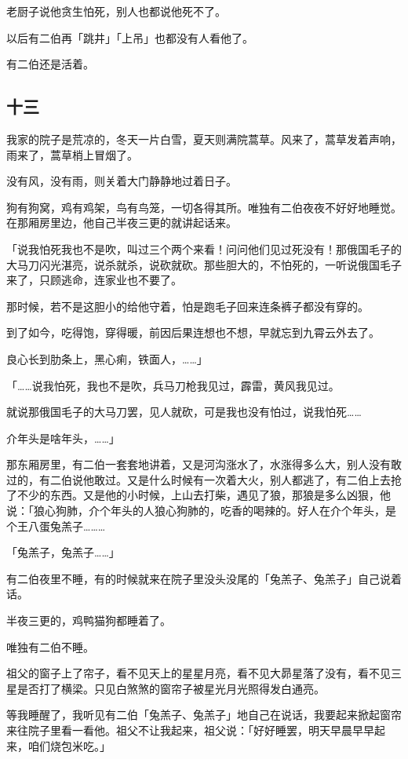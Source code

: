 \documentclass[UTF8]{ctexart}
\begin{document}
老厨子说他贪生怕死，别人也都说他死不了。

以后有二伯再「跳井」「上吊」也都没有人看他了。

{有二伯还是活着。}

\subsection{十三}

我家的院子是荒凉的，冬天一片白雪，夏天则满院蒿草。风来了，蒿草发着声响，雨来了，蒿草梢上冒烟了。

没有风，没有雨，则关着大门静静地过着日子。

狗有狗窝，鸡有鸡架，鸟有鸟笼，一切各得其所。唯独有二伯夜夜不好好地睡觉。在那厢房里边，他自己半夜三更的就讲起话来。

「说我怕死我也不是吹，叫过三个两个来看！问问他们见过死没有！那俄国毛子的大马刀闪光湛亮，说杀就杀，说砍就砍。那些胆大的，不怕死的，一听说俄国毛子来了，只顾逃命，连家业也不要了。

那时候，若不是这胆小的给他守着，怕是跑毛子回来连条裤子都没有穿的。

到了如今，吃得饱，穿得暖，前因后果连想也不想，早就忘到九霄云外去了。

良心长到肋条上，黑心痢，铁面人，……」

「……说我怕死，我也不是吹，兵马刀枪我见过，霹雷，黄风我见过。

就说那俄国毛子的大马刀罢，见人就砍，可是我也没有怕过，说我怕死……

介年头是啥年头，……」

那东厢房里，有二伯一套套地讲着，又是河沟涨水了，水涨得多么大，别人没有敢过的，有二伯说他敢过。又是什么时候有一次着大火，别人都逃了，有二伯上去抢了不少的东西。又是他的小时候，上山去打柴，遇见了狼，那狼是多么凶狠，他说：「狼心狗肺，介个年头的人狼心狗肺的，吃香的喝辣的。好人在介个年头，是个王八蛋兔羔子………

「兔羔子，兔羔子……」

有二伯夜里不睡，有的时候就来在院子里没头没尾的「兔羔子、兔羔子」自己说着话。

半夜三更的，鸡鸭猫狗都睡着了。

唯独有二伯不睡。

祖父的窗子上了帘子，{看不见天上的星星月亮，看不见大昴星落了没有，看不见三星是否打了横梁。}只见白煞煞的窗帘子被星光月光照得发白通亮。

等我睡醒了，我听见有二伯「兔羔子、兔羔子」地自己在说话，我要起来掀起窗帘来往院子里看一看他。祖父不让我起来，祖父说：「好好睡罢，明天早晨早早起来，咱们烧包米吃。」
\end{document}
